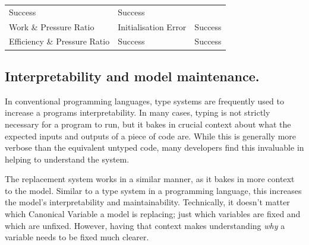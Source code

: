 \begin{longtable}[]{@{}lll@{}}
\begin{minipage}[t]{0.36\columnwidth}
Success\strut
\end{minipage} & \begin{minipage}[t]{0.37\columnwidth}\raggedright
Success\strut
\end{minipage}\tabularnewline
\begin{minipage}[t]{0.19\columnwidth}\raggedright
Work \& Pressure Ratio\strut
\end{minipage} & \begin{minipage}[t]{0.36\columnwidth}\raggedright
Initialisation Error\strut
\end{minipage} & \begin{minipage}[t]{0.37\columnwidth}\raggedright
Success\strut
\end{minipage}\tabularnewline
\begin{minipage}[t]{0.19\columnwidth}\raggedright
Efficiency \& Pressure Ratio\strut
\end{minipage} & \begin{minipage}[t]{0.36\columnwidth}\raggedright
Success\strut
\end{minipage} & \begin{minipage}[t]{0.37\columnwidth}\raggedright
Success\strut
\end{minipage}\tabularnewline
\bottomrule
\end{longtable}

\hypertarget{interpretability-and-model-maintenance.}{%
\subsection{Interpretability and model
maintenance.}\label{interpretability-and-model-maintenance.}}

In conventional programming languages, type systems are frequently used
to increase a programs interpretability. In many cases, typing is not
strictly necessary for a program to run, but it bakes in crucial context
about what the expected inputs and outputs of a piece of code are. While
this is generally more verbose than the equivalent untyped code, many
developers find this invaluable in helping to understand the system.

The replacement system works in a similar manner, as it bakes in more
context to the model. Similar to a type system in a programming
language, this increases the model's interpretability and
maintainability. Technically, it doesn't matter which Canonical Variable a
model is replacing; just which variables are fixed and which are
unfixed. However, having that context makes understanding \emph{why} a
variable needs to be fixed much clearer.

